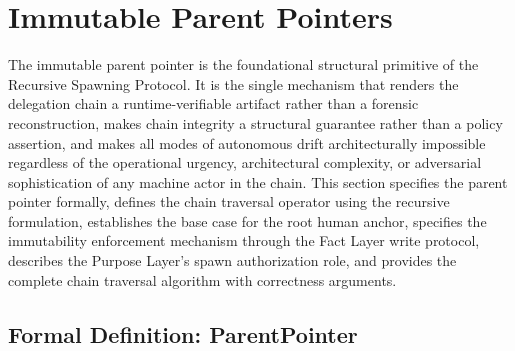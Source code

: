 \section{Immutable Parent Pointers}
\label{sec:immutable-parent-pointers}

The immutable parent pointer is the foundational structural primitive of the Recursive Spawning Protocol. It is the single mechanism that renders the delegation chain a runtime-verifiable artifact rather than a forensic reconstruction, makes chain integrity a structural guarantee rather than a policy assertion, and makes all modes of autonomous drift architecturally impossible regardless of the operational urgency, architectural complexity, or adversarial sophistication of any machine actor in the chain. This section specifies the parent pointer formally, defines the chain traversal operator using the recursive formulation, establishes the base case for the root human anchor, specifies the immutability enforcement mechanism through the Fact Layer write protocol, describes the Purpose Layer's spawn authorization role, and provides the complete chain traversal algorithm with correctness arguments.

\subsection{Formal Definition: ParentPointer}
\label{sec:parent-pointer-definition}

